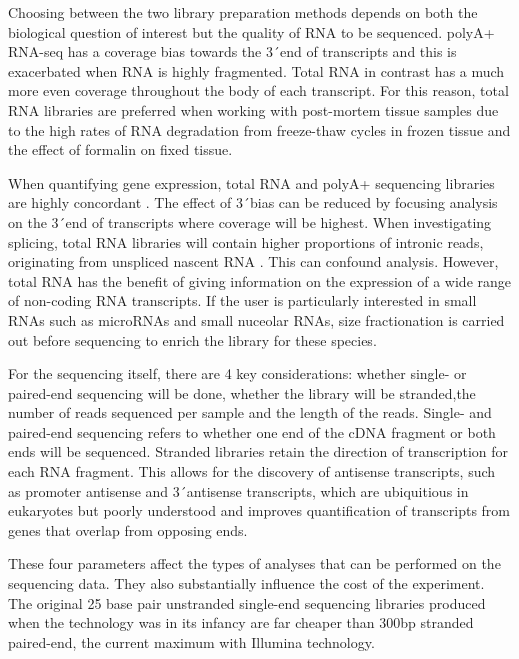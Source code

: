Choosing between the two library preparation methods depends on both the biological question of interest but the quality of RNA to be sequenced.
polyA+ RNA-seq has a coverage bias towards the 3\'\ end of transcripts and this is exacerbated when RNA is highly fragmented.  
Total RNA in contrast has a much more even coverage throughout the body of each transcript.
For this reason, total RNA libraries are preferred when working with post-mortem tissue samples due to the high rates of RNA degradation from freeze-thaw cycles in frozen tissue and the effect of formalin on fixed tissue.

When quantifying gene expression, total RNA and polyA+ sequencing libraries are highly concordant \citep{Cui2010,Zhao2018}. 
The effect of 3\'\ bias can be reduced by focusing analysis on the 3\'\ end of transcripts where coverage will be highest. 
When investigating splicing, total RNA libraries will contain higher proportions of intronic reads, originating from unspliced nascent RNA \citep{Ameur2011}.
This can confound analysis. 
However, total RNA has the benefit of giving information on the expression of a wide range of non-coding RNA transcripts. 
If the user is particularly interested in small RNAs such as microRNAs and small nuceolar RNAs, size fractionation is carried out before sequencing to enrich the library for these species.

For the sequencing itself, there are 4 key considerations: whether single- or paired-end sequencing will be done, whether the library will be stranded,the number of reads sequenced per sample and the length of the reads.
Single- and paired-end sequencing refers to whether one end of the cDNA fragment or both ends will be sequenced.
Stranded libraries retain the direction of transcription for each RNA fragment.
This allows for the discovery of antisense transcripts, such as promoter antisense and 3\'\ antisense transcripts, which are ubiquitious in eukaryotes but poorly understood \citep{Lavorgna2004} and improves quantification of transcripts from genes that overlap from opposing ends. 

These four parameters affect the types of analyses that can be performed on the sequencing data.
They also substantially influence the cost of the experiment.
The original 25 base pair unstranded single-end sequencing libraries produced when the technology was in its infancy \citep{Mortazavi2008} are far cheaper than 300bp stranded paired-end, the current maximum with Illumina technology. 

